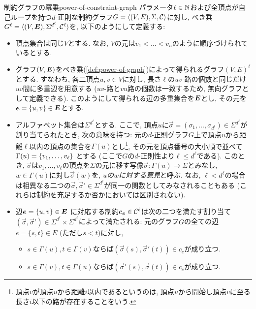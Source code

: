\begin{definition}{制約グラフの冪乗}{power-of-constraint-graph}
  パラメータ$\ell\in\mathbb{N}$および全頂点が自己ループを持つ$d$-正則な制約グラフ$G=\langle(V,E),\Sigma,\mathcal{C}\rangle$に対し, べき乗$G^\ell = \langle(V,\boldsymbol{E}),\Sigma^{d^{\ell}},\mathcal{C}^\ell\rangle$を, 以下のようにして定義する:
  \begin{itemize}
    \item 頂点集合は同じ$V$とする. なお, $V$の元は$v_1<\dots < v_n$のように順序づけられているとする.
    \item グラフ$(V,\boldsymbol{E})$をべき乗(\cref{def:power-of-graph})によって得られるグラフ$(V,E)^\ell$とする. すなわち, 各二頂点$u,v\in V$に対し, 長さ$\ell$の$uv$-路の個数と同じだけ$uv$間に多重辺を用意する ($uv$-路と$vu$路の個数は一致するため, 無向グラフとして定義できる). このようにして得られる辺の多重集合を$\boldsymbol{E}$とし, その元を$\boldsymbol{e} = \{u,v\} \in \boldsymbol{E}$とする.
    \item アルファベット集合は$\Sigma^{d^{\ell}}$とする. ここで, 頂点$u$に$\vec{\sigma}=(\sigma_1,\dots,\sigma_{d^{\ell}}) \in \Sigma^{d^{\ell}}$が割り当てられたとき, 次の意味を持つ: 元の$d$-正則グラフ$G$上で頂点$u$から距離$\ell$以内の頂点の集合を$\Gamma(u)$とし\footnote{頂点$v$が頂点$u$から距離$i$以内であるというのは, 頂点$u$から開始し頂点$v$に至る長さ$i$以下の路が存在することをいう.}, その元を頂点番号の大小順で並べて$\Gamma(u)=\qty{ v_1,\dots,v_\ell}$ とする (ここで$G$の$d$-正則性より$\ell \le d^{\ell}$である). このとき, $\vec{\sigma}$は$v_1,\dots,v_\ell$の頂点を$\Sigma$の元に移す写像$\vec{\sigma} \colon \Gamma(u)\to\Sigma$とみなし, $w\in\Gamma(u)$に対し$\vec{\sigma}(w)$を, \emph{$u$の$w$に対する意見}と呼ぶ.
    なお, $\ell < d^{\ell}$の場合は相異なる二つの$\vec{\sigma},\vec{\sigma}'\in\Sigma^{d^{\ell}}$が同一の関数としてみなされることもある (これらは制約を充足するか否かにおいては区別されない).
    \item 辺$\boldsymbol{e} = \{u,v\} \in \boldsymbol{E}$ に対応する制約$\boldsymbol{c}_{\boldsymbol{e}}\in \mathcal{C}^\ell$は次の二つを満たす割り当て$(\vec{\sigma},\vec{\sigma}')\in \Sigma^{d^{\ell}} \times \Sigma^{d^{\ell}}$によって満たされる:
    元のグラフ$G$の全ての辺$e=\{s,t\}\in E$ (ただし$s<t$)に対し,
      \begin{itemize}
        \item $s\in \Gamma(u), t\in\Gamma(v)$ならば$(\vec{\sigma}(s), \vec{\sigma}'(t))\in c_e$が成り立つ.
        \item $s\in\Gamma(v), t\in\Gamma(u)$ならば$(\vec{\sigma}'(s), \vec{\sigma}(t))\in c_e$が成り立つ.
      \end{itemize}
  \end{itemize}
\end{definition}

